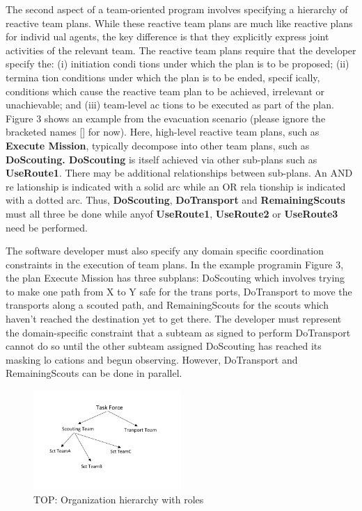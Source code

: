 \documentclass{IEEEtran}
\begin{document}
 The second aspect of a team-oriented program involves
 specifying a hierarchy of reactive team plans. While these
 reactive team plans are much like reactive plans for individ
ual agents, the key difference is that they explicitly express
 joint activities of the relevant team. The reactive team plans
 require that the developer specify the: (i) initiation condi
tions under which the plan is to be proposed; (ii) termina
tion conditions under which the plan is to be ended, specif
ically, conditions which cause the reactive team plan to be
 achieved, irrelevant or unachievable; and (iii) team-level ac
tions to be executed as part of the plan. Figure 3 shows
 an example from the evacuation scenario (please ignore the
 bracketed names [] for now). Here, high-level reactive team
 plans, such as {\bfseries Execute Mission}, typically decompose into
 other team plans, such as {\bfseries DoScouting. DoScouting} is itself
 achieved via other sub-plans such as {\bfseries UseRoute1}. There may
 be additional relationships between sub-plans. An AND re
lationship is indicated with a solid arc while an OR rela
tionship is indicated with a dotted arc. Thus, {\bfseries DoScouting},
 {\bfseries DoTransport} and {\bfseries RemainingScouts} must all three be done
 while anyof {\bfseries UseRoute1}, {\bfseries UseRoute2} or {\bfseries UseRoute3} need be
 performed.

 The software developer must also specify any domain
specific coordination constraints in the execution of team
 plans. In the example programin Figure 3, the plan Execute
 Mission has three subplans: DoScouting which involves
 trying to make one path from X to Y safe for the trans
ports, DoTransport to move the transports along a scouted
 path, and RemainingScouts for the scouts which haven't
 reached the destination yet to get there. The developer must
 represent the domain-specific constraint that a subteam as
signed to perform DoTransport cannot do so until the other
 subteam assigned DoScouting has reached its masking lo
cations and begun observing. However, DoTransport and
 RemainingScouts can be done in parallel.

\begin{figure}[htb]
        \centering
        \includegraphics[width=0.5\textwidth]{figure0002.pdf}
        \caption{TOP: Organization hierarchy with roles}
        \label{fig:0002}
        \end{figure}
\end{document}
